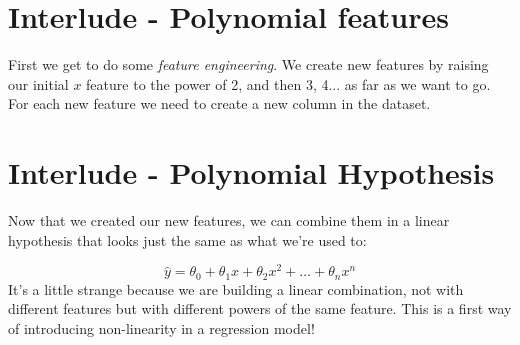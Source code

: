 \section*{Interlude - Polynomial features}
First we get to do some \textit{feature engineering}.
We create new features by raising our initial $x$ feature to the power of 2, and then 3, 4... as far as we want to go.
For each new feature we need to create a new column in the dataset.

\section*{Interlude - Polynomial Hypothesis}
Now that we created our new features, we can combine them in a linear hypothesis that looks just the same as what we're used to:

$$
\hat{y} = \theta_0 + \theta_1 x  +\theta_2 x^{2} + \dots + \theta_n x^{n}
$$  
It's a little strange because we are building a linear combination, not with different features but with different powers of the same feature.
This is a first way of introducing non-linearity in a regression model!